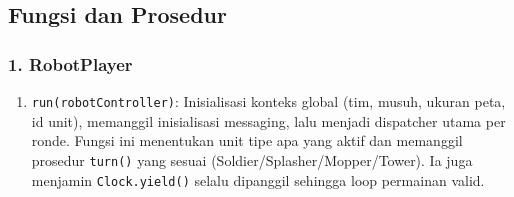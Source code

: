 \newpage
\subsection{Fungsi dan Prosedur}

\subsubsection{1. RobotPlayer}
\begin{enumerate}
	\item \texttt{run(robotController)}:
	      Inisialisasi konteks global (tim, musuh, ukuran peta, id unit), memanggil inisialisasi messaging, lalu menjadi dispatcher utama per ronde. Fungsi ini menentukan unit tipe apa yang aktif dan memanggil prosedur \texttt{turn()} yang sesuai (Soldier/Splasher/Mopper/Tower). Ia juga menjamin \texttt{Clock.yield()} selalu dipanggil sehingga loop permainan valid.
\end{enumerate}


